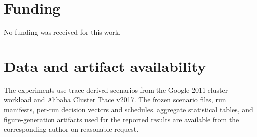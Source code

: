 \documentclass[preprint,12pt]{elsarticle}
\begin{document}











\section*{Funding}
No funding was received for this work.

\section*{Data and artifact availability}
The experiments use trace-derived scenarios from the Google 2011 cluster workload and Alibaba Cluster Trace v2017. The frozen scenario files, run manifests, per-run decision vectors and schedules, aggregate statistical tables, and figure-generation artifacts used for the reported results are available from the corresponding author on reasonable request.



\end{document}
